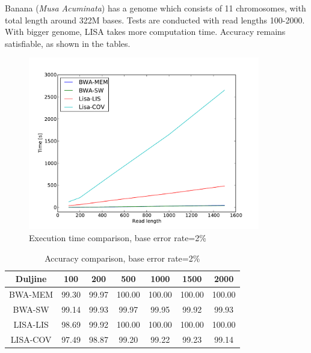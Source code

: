 \documentclass[times, utf8, diplomski]{fer}
\begin{document}
Banana (\emph{Musa Acuminata}) has a genome which consists of 11 chromosomes, with total length around 322M bases. Tests are conducted with read lengths 100-2000. With bigger genome, LISA takes more computation time. Accuracy remains satisfiable, as shown in the tables.

\begin{figure}[H]
\centering
\includegraphics[width=0.9\textwidth]{../img/banana-e02-time.pdf}
\caption{Execution time comparison, base error rate=2\%}\label{banana-e02-time}
\end{figure}

\begin{table}[H]
\centering
\begin{tabular}{|c||c|c|c|c|c|c|}
\hline
	Duljine & 100 & 200 & 500 & 1000 & 1500 & 2000\\
\hline
\hline
	BWA-MEM & 99.30 & 99.97 & 100.00 & 100.00 & 100.00 & 100.00\\
\hline
	BWA-SW  & 99.14 & 99.93 & 99.97 & 99.95 & 99.92 & 99.93\\
\hline
	LISA-LIS   & 98.69 & 99.92 & 100.00 & 100.00 & 100.00 & 100.00\\
\hline
	LISA-COV & 97.49 & 98.87 & 99.20 & 99.22 & 99.23 & 99.14\\
\hline
\end{tabular}
\caption{Accuracy comparison, base error rate=2\%}\label{banana-e02-correct}
\end{table}
\end{document}
